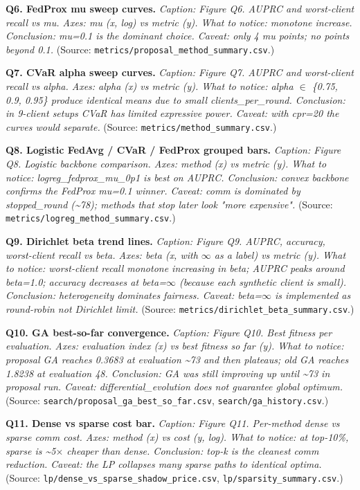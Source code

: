 \documentclass{article}
\begin{document}
\textbf{Q6. FedProx mu sweep curves.} \emph{Caption: Figure Q6. AUPRC and worst-client recall vs mu. Axes: mu (x, log) vs metric (y). What to notice: monotone increase. Conclusion: mu=0.1 is the dominant choice. Caveat: only 4 mu points; no points beyond 0.1.} (Source: \texttt{metrics/proposal\_method\_summary.csv}.)


\textbf{Q7. CVaR alpha sweep curves.} \emph{Caption: Figure Q7. AUPRC and worst-client recall vs alpha. Axes: alpha (x) vs metric (y). What to notice: alpha \ensuremath{\in} \{0.75, 0.9, 0.95\} produce identical means due to small clients\_per\_round. Conclusion: in 9-client setups CVaR has limited expressive power. Caveat: with cpr=20 the curves would separate.} (Source: \texttt{metrics/method\_summary.csv}.)


\textbf{Q8. Logistic FedAvg / CVaR / FedProx grouped bars.} \emph{Caption: Figure Q8. Logistic backbone comparison. Axes: method (x) vs metric (y). What to notice: logreg\_fedprox\_mu\_0p1 is best on AUPRC. Conclusion: convex backbone confirms the FedProx mu=0.1 winner. Caveat: comm is dominated by stopped\_round (\textasciitilde{}78); methods that stop later look "more expensive".} (Source: \texttt{metrics/logreg\_method\_summary.csv}.)


\textbf{Q9. Dirichlet beta trend lines.} \emph{Caption: Figure Q9. AUPRC, accuracy, worst-client recall vs beta. Axes: beta (x, with \ensuremath{\infty} as a label) vs metric (y). What to notice: worst-client recall monotone increasing in beta; AUPRC peaks around beta=1.0; accuracy decreases at beta=\ensuremath{\infty} (because each synthetic client is small). Conclusion: heterogeneity dominates fairness. Caveat: beta=\ensuremath{\infty} is implemented as round-robin not Dirichlet limit.} (Source: \texttt{metrics/dirichlet\_beta\_summary.csv}.)


\textbf{Q10. GA best-so-far convergence.} \emph{Caption: Figure Q10. Best fitness per evaluation. Axes: evaluation index (x) vs best fitness so far (y). What to notice: proposal GA reaches 0.3683 at evaluation \textasciitilde{}73 and then plateaus; old GA reaches 1.8238 at evaluation 48. Conclusion: GA was still improving up until \textasciitilde{}73 in proposal run. Caveat: differential\_evolution does not guarantee global optimum.} (Source: \texttt{search/proposal\_ga\_best\_so\_far.csv}, \texttt{search/ga\_history.csv}.)


\textbf{Q11. Dense vs sparse cost bar.} \emph{Caption: Figure Q11. Per-method dense vs sparse comm cost. Axes: method (x) vs cost (y, log). What to notice: at top-10\%, sparse is \textasciitilde{}5\ensuremath{\times} cheaper than dense. Conclusion: top-k is the cleanest comm reduction. Caveat: the LP collapses many sparse paths to identical optima.} (Source: \texttt{lp/dense\_vs\_sparse\_shadow\_price.csv}, \texttt{lp/sparsity\_summary.csv}.)
\end{document}
